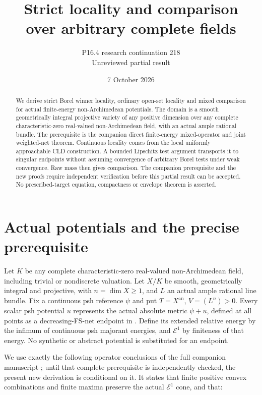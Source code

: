 \documentclass[11pt]{article}
\title{Strict locality and comparison\\over arbitrary complete fields}
\author{P16.4 research continuation 218\\Unreviewed partial result}
\date{7 October 2026}
\newcommand{\E}{\mathcal E}
\begin{document}
\maketitle
\begin{abstract}
We derive strict Borel winner locality, ordinary open-set locality
and mixed comparison for actual finite-energy non-Archimedean
potentials. The domain is a smooth geometrically integral projective
variety of any positive dimension over any complete characteristic-zero
real-valued non-Archimedean field, with an actual ample rational
bundle. The prerequisite is the companion direct finite-energy
mixed-operator and joint weighted-net theorem. Continuous locality
comes from the local uniformly approachable CLD construction.
A bounded Lipschitz test argument transports it to singular
endpoints without assuming convergence of arbitrary Borel tests
under weak convergence. Raw mass then gives comparison. The
companion prerequisite and the new proofs require independent
verification before this partial result can be accepted. No
prescribed-target equation, compactness or envelope theorem is
asserted.
\end{abstract}

\section{Actual potentials and the precise prerequisite}

Let $K$ be any complete characteristic-zero real-valued
non-Archimedean field, including trivial or nondiscrete valuation.
Let $X/K$ be smooth, geometrically integral and projective, with
$n=\dim X\geq1$, and $L$ an actual ample rational line bundle.
Fix a continuous psh reference $\psi$ and put
$T=X^{\mathrm{an}}$, $V=(L^n)>0$.
Every scalar psh potential $u$ represents the actual absolute
metric $\psi+u$, defined at all points as a decreasing-FS-net
endpoint in \cite[Definition 7.2]{BE}. Define its extended relative
energy by the infimum of continuous psh majorant energies, and
$\E^1$ by finiteness of that energy. No synthetic or abstract
potential is substituted for an endpoint.

We use exactly the following operator conclusions of the full
companion manuscript \cite{O}; until that complete prerequisite is
independently checked, the present new derivation is conditional
on it. It states that finite positive convex combinations and finite
maxima preserve the actual $\E^1$ cone, and that:
\end{document}
